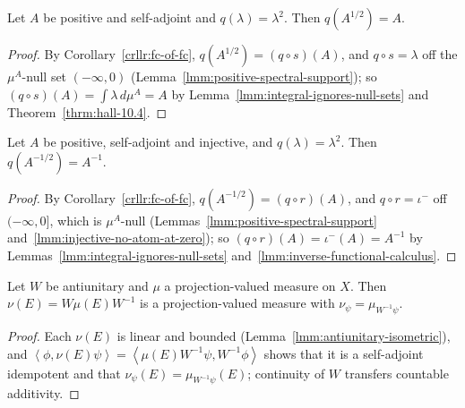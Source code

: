 \begin{lemma}
    \label{lmm:square-of-square-root}
    \leanok
    Let $A$ be positive and self-adjoint and $q(\lambda) = \lambda^2$. Then $q(A^{1/2}) = A$.
\end{lemma}
\begin{proof}
    \leanok
    By Corollary~\ref{crllr:fc-of-fc}, $q(A^{1/2}) = (q \circ s)(A)$, and $q \circ s = \lambda$ off the $\mu^A$-null set $(-\infty, 0)$ (Lemma~\ref{lmm:positive-spectral-support}); so $(q \circ s)(A) = \int \lambda \, d\mu^A = A$ by Lemma~\ref{lmm:integral-ignores-null-sets} and Theorem~\ref{thrm:hall-10.4}.
\end{proof}

\begin{lemma}
    \label{lmm:square-of-inverse-square-root}
    \leanok
    Let $A$ be positive, self-adjoint and injective, and $q(\lambda) = \lambda^2$. Then $q(A^{-1/2}) = A^{-1}$.
\end{lemma}
\begin{proof}
    \leanok
    By Corollary~\ref{crllr:fc-of-fc}, $q(A^{-1/2}) = (q \circ r)(A)$, and $q \circ r = \iota^{-}$ off $(-\infty, 0]$, which is $\mu^A$-null (Lemmas~\ref{lmm:positive-spectral-support} and~\ref{lmm:injective-no-atom-at-zero}); so $(q \circ r)(A) = \iota^-(A) = A^{-1}$ by Lemmas~\ref{lmm:integral-ignores-null-sets} and~\ref{lmm:inverse-functional-calculus}.
\end{proof}

\begin{lemma}
    \label{lmm:antiunitary-conjugate-pvm-is-pvm}
    \leanok
    Let $W$ be antiunitary and $\mu$ a projection-valued measure on $X$. Then $\nu(E) = W\mu(E)W^{-1}$ is a projection-valued measure with $\nu_\psi = \mu_{W^{-1}\psi}$.
\end{lemma}
\begin{proof}
    \leanok
    Each $\nu(E)$ is linear and bounded (Lemma~\ref{lmm:antiunitary-isometric}), and $\left< \phi, \nu(E)\psi \right> = \left< \mu(E)W^{-1}\psi, W^{-1}\phi \right>$ shows that it is a self-adjoint idempotent and that $\nu_\psi(E) = \mu_{W^{-1}\psi}(E)$; continuity of $W$ transfers countable additivity.
\end{proof}

